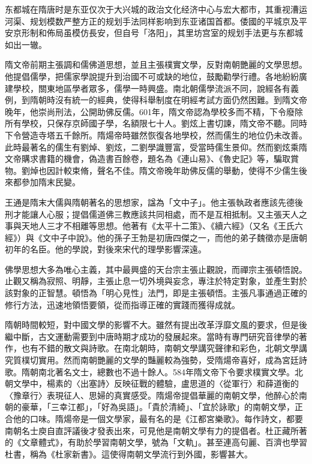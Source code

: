 东都城在隋唐时是东亚仅次于大兴城的政治文化经济中心与宏大都市，其重视漕运河渠、规划模数严整方正的规划手法同样影响到东亚诸国首都。倭國的平城京及平安京形制和佈局虽模仿長安，但自号「洛阳」，其里坊宫室的规划手法更与东都城如出一辙。

隋文帝前期主張調和儒佛道思想，並且主張樸實文學，反對南朝艷麗的文學思想。他提倡儒學，把儒家學說提升到治國不可或缺的地位，鼓勵勸學行禮。各地紛紛廣建學校，關東地區學者眾多，儒學一時興盛。南北朝儒學流派不同，說經各有義例，到隋朝時沒有統一的經典，使得科舉制度在明經考試方面仍然困難。到隋文帝晚年，他崇尚刑法，公開助佛反儒。601年，隋文帝認為學校多而不精，下令廢除所有學校，只保存京師國子學，名額限七十人。劉炫上書切諫，隋文帝不聽。同時下令營造寺塔五千餘所。隋煬帝時雖然恢復各地學校，然而儒生的地位仍未改善。此時最著名的儒生有劉焯、劉炫，二劉學識豐富，受當時儒生景仰。然而劉炫乘隋文帝購求書籍的機會，偽造書百餘卷，題名為《連山易》、《魯史記》等，騙取賞物。劉焯也因計較束脩，聲名不佳。隋文帝晚年助佛反儒的舉動，使得不少儒生後來都參加隋末民變。

王通是隋末大儒與隋朝著名的思想家，諡為「文中子」。他主張執政者應該先德後刑才能讓人心服；提倡儒道佛三教應該共同相處，而不是互相抵制。又主張天人之事與天地人三才不相離等思想。他著有《太平十二策》、《續六經》（又名《王氏六經》）與《文中子中說》。他的孫子王勃是初唐四傑之一，而他的弟子魏徵亦是唐朝初年的名臣。他的學說，對後來宋代的理學影響深遠。

佛學思想大多為唯心主義，其中最興盛的天台宗主張止觀說，而禪宗主張頓悟說。止觀又稱為寂照、明靜，主張止息一切外境與妄念，專注於特定對象，並產生對於該對象的正智慧。頓悟為「明心見性」法門，即是主張頓悟。主張凡事通過正確的修行方法，迅速地領悟要領，從而指導正確的實踐而獲得成就。

隋朝時間較短，對中國文學的影響不大。雖然有提出改革浮靡文風的要求，但是後繼中斷，古文運動需要到中唐時期才成功的發展起來。當時有專門研究音律學的著作，也有不錯的散文與詩歌。在南北朝時，南朝文學講究聲律和彩色，北朝文學講究質樸切實用。然而南朝艷麗的文學的豔麗較為強勢，受隋煬帝喜好，成為宮廷詩歌。隋朝南北著名文士，總數也不過十餘人。584年隋文帝下令要求樸實文學。北朝文學中，楊素的〈出塞詩〉反映征戰的體驗，盧思道的〈從軍行〉和薛道衡的〈豫章行〉表現征人、思婦的真實感受。隋煬帝提倡華麗的南朝文學，他醉心於南朝的豪華，「三幸江都」，「好為吳語」。「貴於清綺」、「宜於詠歌」的南朝文學，正合他的口味。隋煬帝是一個文學家，最有名的是《江都宮樂歌》。每作詩文，都要南朝名士庾自直評議後才發表出來，可見他是南朝文學有力的提倡者。杜正藏所著的《文章體式》，有助於學習南朝文學，號為「文軌」。甚至連高句麗、百濟也學習杜書，稱為《杜家新書》。這使得南朝文學流行到外國，影響甚大。

